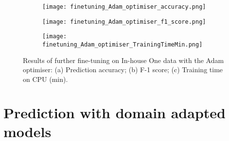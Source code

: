 \documentclass[a4paper,12pt]{article}
\newcommand{\figwidthhh}{0.45\textwidth}
\newcommand{\inghamOne}{In-house One\xspace}   %
\begin{document}
	
\begin{figure}[h!]
	\begin{center}
		\begin{subfigure}[b]{\figwidthhh}
			\caption{} 
			\texttt{[image: finetuning\_Adam\_optimiser\_accuracy.png]}
		\end{subfigure}
        \hfill
		\begin{subfigure}[b]{\figwidthhh}
			\caption{}
			\texttt{[image: finetuning\_Adam\_optimiser\_f1\_score.png]}
		\end{subfigure}
        \hfill
		\begin{subfigure}[b]{\figwidthhh}
			\caption{}
			\texttt{[image: finetuning\_Adam\_optimiser\_TrainingTimeMin.png]}
		\end{subfigure}
	\end{center}                                                                
	\caption{Results of further fine-tuning on \inghamOne data with the Adam optimiser: (a) Prediction accuracy; (b) F-1 score; (c) Training time on CPU (min).
	} 
\end{figure}


\newpage


\section{Prediction with domain adapted models}
\end{document}
